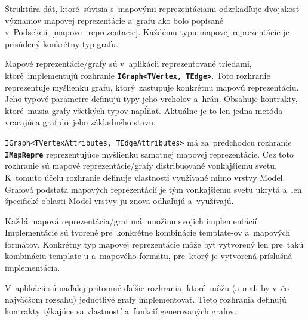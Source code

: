 \bigskip

Štruktúra dát, ktoré~súvisia s~mapovými reprezentáciami odzrkadľuje dvojakosť významov mapovej reprezentácie a~grafu ako bolo popísané v~Podsekcii~\ref{mapove_reprezentacie}. Každému typu mapovej reprezentácie je prisúdený konkrétny typ grafu.

Mapové reprezentácie/grafy sú v~aplikácii reprezentované triedami, ktoré~implementujú rozhranie \textbf{\texttt{IGraph<TVertex, TEdge>}}. Toto rozhranie reprezentuje myšlienku grafu, ktorý~zastupuje konkrétnu mapovú reprezentáciu. Jeho typové parametre definujú typy jeho vrcholov a~hrán. Obsahuje kontrakty, ktoré~musia grafy všetkých typov napĺňať. Aktuálne je to len jedna metóda vracajúca graf do~jeho základného stavu.

\texttt{IGraph<TVertexAttributes, TEdgeAttributes>} má za~predchodcu rozhranie \textbf{\texttt{IMapRepre}} reprezentujúce myšlienku samotnej mapovej reprezentácie. Cez toto rozhranie sú mapové reprezentácie/grafy distribuované vonkajšiemu svetu. K~tomuto účelu rozhranie definuje vlastnosti využívané mimo vrstvy Model. Grafová podstata mapových reprezentácií je tým vonkajšiemu svetu ukrytá a~len špecifické oblasti Model vrstvy ju znova odhaľujú a~využívajú.

Každá mapová reprezentácia/graf má množinu svojich implementácií. Implementácie sú tvorené pre~konkrétne kombinácie template-ov a~mapových formátov. Konkrétny typ mapovej reprezentácie môže byť vytvorený len pre~takú kombináciu template-u a~mapového formátu, pre~ktorý je vytvorená príslušná implementácia.

V~aplikácii sú naďalej prítomné ďalšie rozhrania, ktoré~môžu (a mali by v~čo najväčšom rozsahu) jednotlivé grafy implementovať. Tieto rozhrania definujú kontrakty týkajúce sa vlastností a~funkcií generovaných grafov.

\bigskip

